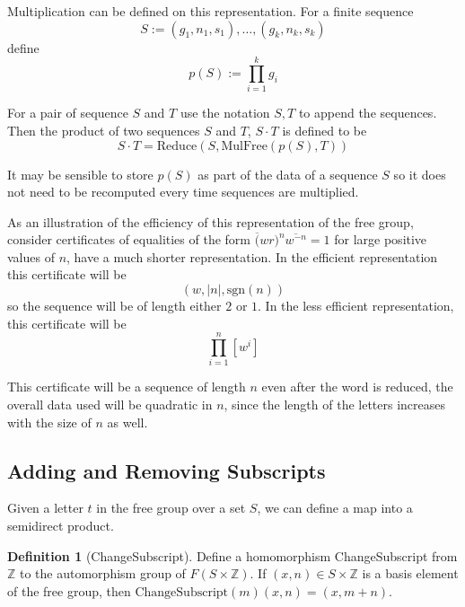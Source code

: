 \documentclass[11pt]{article} %
\theoremstyle{definition}
\theoremstyle{definition}
\theoremstyle{definition}
\theoremstyle{definition}
\theoremstyle{definition}
\newtheorem{defn}[theorem]{Definition}
\theoremstyle{definition}
\begin{document}

Multiplication can be defined on this representation.
For a finite sequence
\begin{equation}
  S := (g_1, n_1, s_1), \dots, (g_k, n_k, s_k)
\end{equation}
define
\begin{equation}
  p(S) := \prod_{i=1}^k g_i
\end{equation}

For a pair of sequence $S$ and $T$ use the notation $S,T$ to append the sequences.
Then the product of two sequences $S$ and $T$, $S\cdot T$ is defined to be
\begin{equation}
  S \cdot T = \text{Reduce}(S, \text{MulFree}(p(S), T))
\end{equation}

It may be sensible to store $p(S)$ as part of the data of a sequence $S$ so it does not
need to be recomputed every time sequences are multiplied.

As an illustration of the efficiency of this
representation of the free group, consider certificates of equalities
of the form $\overline(wr)^n \overline{w^{-n}} = 1$ for
large positive values of $n$,
have a much shorter representation.
In the efficient representation this certificate will
be
\begin{equation}
  (w, |n|, \text{sgn}(n))
\end{equation}
so the sequence
will be of length either $2$ or $1$. In the less efficient representation,
this certificate will be
\begin{equation}
  \prod_{i=1}^n [w^i]
\end{equation}

This certificate will be a sequence of length $n$ even after the word is reduced,
the overall data used will be quadratic in $n$, since the length of the letters
increases with the size of $n$ as well.

\subsection{Adding and Removing Subscripts}

Given a letter $t$ in the free group over a set $S$, we can define a map into a
semidirect product.

\begin{defn}[ChangeSubscript]\label{csub}
  Define a homomorphism ChangeSubscript from $\mathbb{Z}$ to the automorphism
  group of $F(S \times \mathbb{Z})$. If $(x, n) \in S \times \mathbb{Z}$ is a basis
  element of the free group, then $\text{ChangeSubscript}(m)(x, n) = (x, m + n)$.
\end{defn}
\end{document}
